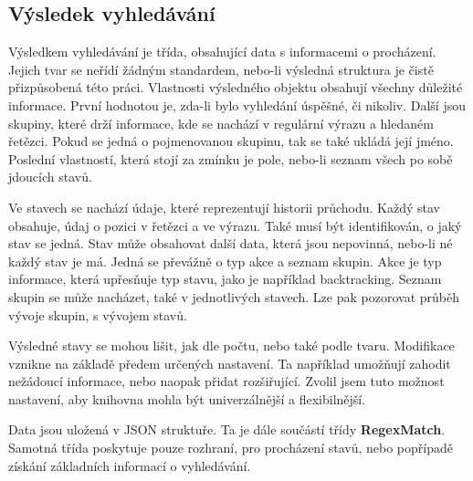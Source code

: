 \subsection*{Výsledek vyhledávání}

Výsledkem vyhledávání je třída, obsahující data s informacemi o procházení.
Jejich tvar se neřídí žádným standardem, nebo-li výsledná struktura je čistě přizpůsobená této práci.
Vlastnosti výsledného objektu obsahují všechny důležité informace.
První hodnotou je, zda-li bylo vyhledání úspěšné, či nikoliv. 
Další jsou skupiny, které drží informace, kde se nachází v regulární výrazu a hledaném řetězci. 
Pokud se jedná o pojmenovanou skupinu, tak se také ukládá její jméno. 
Poslední vlastností, která stojí za zmínku je pole, nebo-li seznam všech po sobě jdoucích stavů.

Ve stavech se nachází údaje, které reprezentují historii průchodu.
Každý stav obsahuje, údaj o pozici v řetězci a ve výrazu. 
Také musí být identifikován, o jaký stav se jedná.
Stav může obsahovat další data, která jsou nepovinná, nebo-li né každý stav je má.
Jedná se převážně o typ akce a seznam skupin.
Akce je typ informace, která upřesňuje typ stavu, jako je například backtracking.
Seznam skupin se může nacházet, také v jednotlivých stavech.
Lze pak pozorovat průběh vývoje skupin, s vývojem stavů.

Výsledné stavy se mohou lišit, jak dle počtu, nebo také podle tvaru. 
Modifikace vznikne na základě předem určených nastavení.
Ta například umožňují zahodit nežádoucí informace, nebo naopak přidat rozšiřující.
Zvolil jsem tuto možnost nastavení, aby knihovna mohla být univerzálnější a flexibilnější.

Data jsou uložená v JSON struktuře.
Ta je dále součástí třídy \textbf{RegexMatch}.
Samotná třída poskytuje pouze rozhraní, pro procházení stavů, nebo popřípadě získání základních informací o vyhledávání.

\endinput